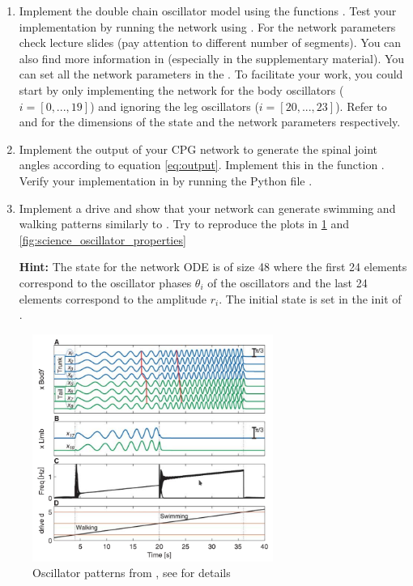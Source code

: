 \documentclass{cmc}
\begin{document}
\begin{enumerate}
\item Implement the double chain oscillator model using the functions
  . Test your implementation by running the
  network using . For the network parameters check
  lecture slides (pay attention to different number of segments). You can also
  find more information in \cite{ijspeert2007swimming} (especially in the
  supplementary material). You can set all the network parameters in the
  . To facilitate your work, you
  could start by only implementing the network for the body oscillators
  ($i=[0, ..., 19]$) and ignoring the leg oscillators ($i=[20, ..., 23]$). Refer
  to  and
  \- for the dimensions of
  the state and the network parameters respectively.

\item Implement the output of your CPG network to generate the spinal joint
  angles according to equation \ref{eq:output}. Implement this in the function
  . Verify your implementation in by running
  the Python file .


\item Implement a drive and show that your network can generate swimming and
  walking patterns similarly to \cite{ijspeert2007swimming}. Try to reproduce
  the plots in \ref{fig:science_oscillator_patterns} and
  \ref{fig:science_oscillator_properties}


  \textbf{Hint:} The state for the network ODE is of size 48 where the first 24
  elements correspond to the oscillator phases $\theta_i$ of the oscillators and
  the last 24 elements correspond to the amplitude $r_i$. The initial state is
  set in the init of .
\end{enumerate}

\begin{figure}[H]
  \centering
  \includegraphics[width=0.7\textwidth]{figures/science_oscillator_patterns}
  \caption{Oscillator patterns from \cite{ijspeert2007swimming}, see
    \cite{ijspeert2007swimming} for details}
  \label{fig:science_oscillator_patterns}
\end{figure}
\end{document}
